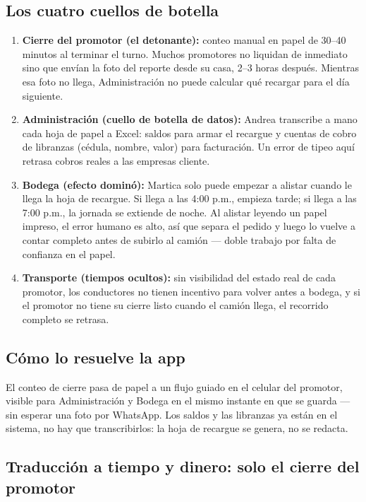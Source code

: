 \documentclass[11pt,a4paper]{article}
\begin{document}
\subsection*{Los cuatro cuellos de botella}

\begin{enumerate}
    \item \textbf{Cierre del promotor (el detonante):} conteo manual en papel de 30--40 minutos al terminar el turno. Muchos promotores no liquidan de inmediato sino que envían la foto del reporte desde su casa, 2--3 horas después. Mientras esa foto no llega, Administración no puede calcular qué recargar para el día siguiente.
    \item \textbf{Administración (cuello de botella de datos):} Andrea transcribe a mano cada hoja de papel a Excel: saldos para armar el recargue y cuentas de cobro de libranzas (cédula, nombre, valor) para facturación. Un error de tipeo aquí retrasa cobros reales a las empresas cliente.
    \item \textbf{Bodega (efecto dominó):} Martica solo puede empezar a alistar cuando le llega la hoja de recargue. Si llega a las 4:00 p.m., empieza tarde; si llega a las 7:00 p.m., la jornada se extiende de noche. Al alistar leyendo un papel impreso, el error humano es alto, así que separa el pedido y luego lo vuelve a contar completo antes de subirlo al camión --- doble trabajo por falta de confianza en el papel.
    \item \textbf{Transporte (tiempos ocultos):} sin visibilidad del estado real de cada promotor, los conductores no tienen incentivo para volver antes a bodega, y si el promotor no tiene su cierre listo cuando el camión llega, el recorrido completo se retrasa.
\end{enumerate}

\subsection*{Cómo lo resuelve la app}

El conteo de cierre pasa de papel a un flujo guiado en el celular del promotor, visible para Administración y Bodega en el mismo instante en que se guarda --- sin esperar una foto por WhatsApp. Los saldos y las libranzas ya están en el sistema, no hay que transcribirlos: la hoja de recargue se genera, no se redacta.

\subsection*{Traducción a tiempo y dinero: solo el cierre del promotor}
\end{document}
